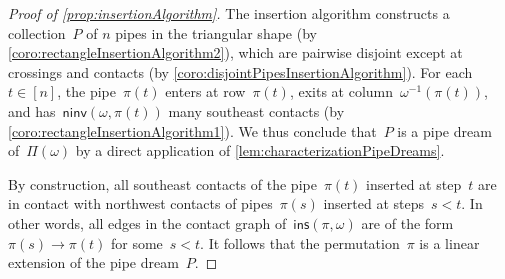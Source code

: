 \documentclass{amsart}
\newtheorem{proposition}[theorem]{Proposition}
\theoremstyle{definition}
\newcommand{\set}[2]{\left\{ #1 \;\middle|\; #2 \right\}} %
\newcommand{\pipeDreams}{\Pi} %
\newcommand{\contact}{^\#} %
\newcommand{\insertion}[2]{\mathsf{ins}(#1,#2)} %
\newcommand{\acyclicPipeDreams}{\Sigma} %
\newcommand{\linearExtensions}{\mathcal{L}} %
\newcommand{\noninversions}[2]{\mathsf{ninv}(#1,#2)} %
\begin{document}
\begin{proof}[Proof of \cref{prop:insertionAlgorithm}]
The insertion algorithm constructs a collection~$P$ of $n$ pipes in the triangular shape (by \cref{coro:rectangleInsertionAlgorithm2}), which are pairwise disjoint except at crossings and contacts (by \cref{coro:disjointPipesInsertionAlgorithm}).
For each~$t \in [n]$, the pipe~$\pi(t)$ enters at row~$\pi(t)$, exits at column~$\omega^{-1}(\pi(t))$, and has~$\noninversions{\omega}{\pi(t)}$ many southeast contacts (by \cref{coro:rectangleInsertionAlgorithm1}).
We thus conclude that~$P$ is a pipe dream of~$\pipeDreams(\omega)$ by a direct application of \cref{lem:characterizationPipeDreams}.

By construction, all southeast contacts of the pipe~$\pi(t)$ inserted at step~$t$ are in contact with northwest contacts of pipes~$\pi(s)$ inserted at steps~$s < t$.
In other words, all edges in the contact graph of~$\insertion{\pi}{\omega}$ are of the form~$\pi(s) \to \pi(t)$ for some~$s < t$.
It follows that the permutation~$\pi$ is a linear extension of the pipe dream~$P$.
\end{proof}

%
%
\end{document}
